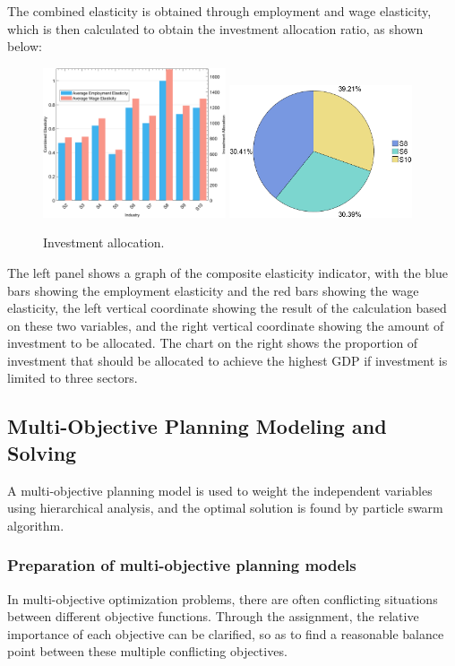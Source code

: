\documentclass[12pt]{article}  %
\begin{document}
	The combined elasticity is obtained through employment and wage elasticity, which is then calculated to obtain the investment allocation ratio, as shown below:
	
	\begin{figure}[H]
		\centering
		\includegraphics[width=0.48\textwidth]{img/q4_all_tanxing_invest}
		\includegraphics[width=0.48\textwidth]{img/q4_three_best} 
		\caption{Investment allocation.}
		\label{threess}
	\end{figure}
	
	
	The left panel shows a graph of the composite elasticity indicator, with the blue bars showing the employment elasticity and the red bars showing the wage elasticity, the left vertical coordinate showing the result of the calculation based on these two variables, and the right vertical coordinate showing the amount of investment to be allocated.
	The chart on the right shows the proportion of investment that should be allocated to achieve the highest GDP if investment is limited to three sectors.
	
\subsection{Multi-Objective Planning Modeling and Solving}
	A multi-objective planning model is used to weight the independent variables using hierarchical analysis, and the optimal solution is found by particle swarm algorithm.
	
	\subsubsection{Preparation of multi-objective planning models}
	In multi-objective optimization problems, there are often conflicting situations between different objective functions. Through the assignment, the relative importance of each objective can be clarified, so as to find a reasonable balance point between these multiple conflicting objectives.
	
\end{document}
